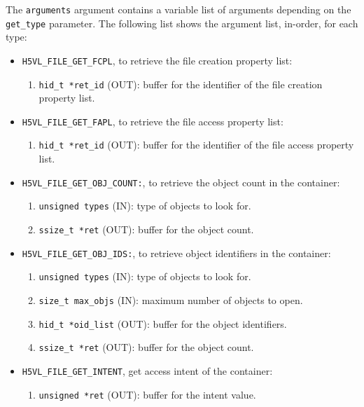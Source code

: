 The {\tt arguments} argument contains a variable list of arguments
depending on the {\tt get\_type} parameter. The following list shows
the argument list, in-order, for each type:

\begin{itemize}
\item {\tt H5VL\_FILE\_GET\_FCPL}, to retrieve the file creation
  property list:
  \begin{enumerate}
  \item {\tt hid\_t *ret\_id} (OUT): buffer for the identifier of the
    file creation property list.
  \end{enumerate}

\item {\tt H5VL\_FILE\_GET\_FAPL}, to retrieve the file access
  property list:
  \begin{enumerate}
  \item {\tt hid\_t *ret\_id} (OUT): buffer for the identifier of the
    file access property list.
  \end{enumerate}

\item {\tt H5VL\_FILE\_GET\_OBJ\_COUNT:}, to retrieve the object count
  in the container:
  \begin{enumerate}
  \item {\tt unsigned types} (IN): type of objects to look for.
  \item {\tt ssize\_t *ret} (OUT): buffer for the object count.
  \end{enumerate}

\item {\tt H5VL\_FILE\_GET\_OBJ\_IDS:}, to retrieve object identifiers
  in the container:
  \begin{enumerate}
  \item {\tt unsigned types} (IN): type of objects to look for.
  \item {\tt size\_t max\_objs} (IN): maximum number of objects to
    open.
  \item {\tt hid\_t *oid\_list} (OUT): buffer for the object identifiers.
  \item {\tt ssize\_t *ret} (OUT): buffer for the object count.
  \end{enumerate}

\item {\tt H5VL\_FILE\_GET\_INTENT}, get access intent of the
  container:
  \begin{enumerate}
  \item {\tt unsigned *ret} (OUT): buffer for the intent value.
  \end{enumerate}


\end{itemize}
